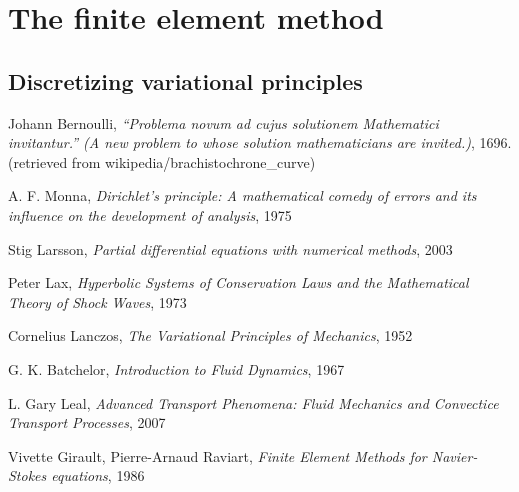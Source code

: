 \documentclass[11pt,a4paper]{memoir}
\begin{document}
\chapter{The finite element method}
\section{Discretizing variational principles}


\begin{thebibliography}{9}
Johann Bernoulli, \textit{``Problema novum ad cujus solutionem Mathematici invitantur.'' (A new problem to whose solution mathematicians are invited.)}, 1696.
(retrieved from wikipedia/brachistochrone\_curve)

A. F. Monna, \textit{Dirichlet's principle: A mathematical comedy of errors and its influence on the development of analysis}, 1975

Stig Larsson, \textit{Partial differential equations with numerical methods}, 2003

Peter Lax, \textit{Hyperbolic Systems of Conservation Laws and the Mathematical Theory of Shock Waves}, 1973

Cornelius Lanczos, \textit{The Variational Principles of Mechanics}, 1952

G. K. Batchelor, \textit{Introduction to Fluid Dynamics}, 1967

L. Gary Leal, \textit{Advanced Transport Phenomena: Fluid Mechanics and Convectice Transport Processes}, 2007

Vivette Girault, Pierre-Arnaud Raviart, \textit{Finite Element Methods for Navier-Stokes equations}, 1986


\end{thebibliography}
\end{document}
